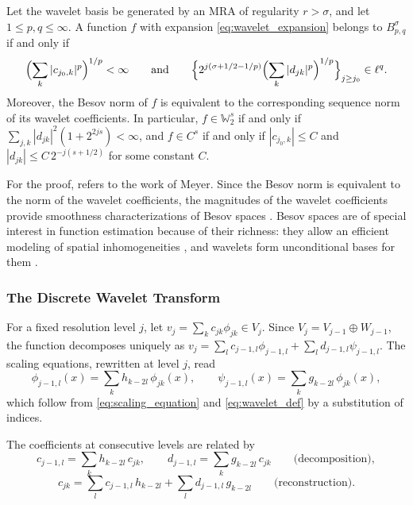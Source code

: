 \begin{theorem}
\label{thm:besov_characterization}
Let the wavelet basis be generated by an MRA of regularity $r>\sigma$, and
let $1\leq p,q\leq\infty$. A function $f$ with expansion
\eqref{eq:wavelet_expansion} belongs to $B^\sigma_{p,q}$ if and only if
\begin{equation*}
\Bigl(\sum_k|c_{j_0,k}|^p\Bigr)^{1/p}<\infty\qquad\text{and}\qquad
\Bigl\{2^{j(\sigma+1/2-1/p)}\Bigl(\sum_k|d_{jk}|^p\Bigr)^{1/p}\Bigr\}_{j\geq
j_0}\in\ell^q.
\end{equation*}
Moreover, the Besov norm of $f$ is equivalent to the corresponding sequence
norm of its wavelet coefficients. In particular, $f\in\mathbb{W}^s_2$ if and
only if $\sum_{j,k}|d_{jk}|^2(1+2^{2js})<\infty$, and $f\in C^s$ if and only
if $|c_{j_0,k}|\leq C$ and $|d_{jk}|\leq C\,2^{-j(s+1/2)}$ for some constant
$C$.
\end{theorem}

For the proof, \cite[Sec.~3.5.3]{vidakovic1999} refers to the work of Meyer.
Since the Besov norm is equivalent to the norm of the
wavelet coefficients, the magnitudes of the wavelet coefficients provide
smoothness characterizations of Besov spaces \cite[Sec.~6.4.1]{vidakovic1999}.
Besov spaces are of special interest in function estimation because of their
richness: they allow an efficient modeling of spatial inhomogeneities
\cite[Sec.~6.4]{vidakovic1999}, and wavelets form unconditional bases for them
\cite{donoho1998}.

\subsubsection{The Discrete Wavelet Transform}

For a fixed resolution level $j$, let $v_j = \sum_kc_{jk}\phi_{jk}\in V_j$.
Since $V_j = V_{j-1}\oplus W_{j-1}$, the function decomposes uniquely as
$v_j = \sum_lc_{j-1,l}\phi_{j-1,l} + \sum_ld_{j-1,l}\psi_{j-1,l}$. The
scaling equations, rewritten at level $j$, read
\cite[Sec.~4.2]{vidakovic1999}
\begin{equation}
\phi_{j-1,l}(x) = \sum_kh_{k-2l}\,\phi_{jk}(x),\qquad
\psi_{j-1,l}(x) = \sum_kg_{k-2l}\,\phi_{jk}(x),
\label{eq:scaling_level_j}
\end{equation}
which follow from \eqref{eq:scaling_equation} and \eqref{eq:wavelet_def}
by a substitution of indices.

\begin{proposition}
\label{prop:cascade}
The coefficients at consecutive levels are related by
\begin{equation}
c_{j-1,l} = \sum_kh_{k-2l}\,c_{jk},\qquad d_{j-1,l} = \sum_kg_{k-2l}\,c_{jk}
\qquad\text{(decomposition)},
\label{eq:cascade_decomposition}
\end{equation}
\begin{equation}
c_{jk} = \sum_lc_{j-1,l}\,h_{k-2l} + \sum_ld_{j-1,l}\,g_{k-2l}
\qquad\text{(reconstruction)}.
\label{eq:cascade_reconstruction}
\end{equation}
\end{proposition}


